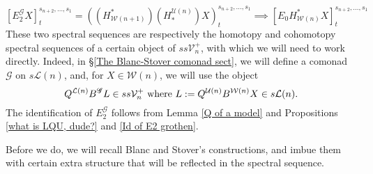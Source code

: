 \documentclass[11pt]{amsart} \renewcommand{\baselinestretch}{1.2}
\theoremstyle{plain}
\numberwithin{equation}{section} %
\theoremstyle{plain}
\numberwithin{equation}{chapter} %
\newcommand{\scrG}{\mathscr{G}}
\newcommand{\calU}{\mathcal{U}}
\newcommand{\calL}{\mathcal{L}}
\newcommand{\calV}{\mathcal{V}}
\newcommand{\calw}{\mathcal{W}}
\newcommand{\vect}[2]{\calV^{#1}_{#2}}
\newcommand{\BSW}{{\scrG}}
\newcommand{\BSWres}{B^\BSW}%
\newcommand{\E}[5]{[E^{#1}_{#2}#3]^{#4}_{#5}}
\newcommand{\Edown}[4]{[E_{#1}#2]^{#3}_{#4}}
\begin{document}
\begin{Comp funct sseqs}
\[\E{\BSW}{2}{X}{s_{n+2},\ldots,s_1}{t}=((H^*_{\calw(n+1)})(H_*^{\calU(n)})X)^{s_{n+2},\ldots,s_1}_t\implies \Edown{0}{H^*_{\calw(n)}X}{s_{n+2},\ldots,s_1}{t}\]
These two spectral sequences are respectively the homotopy and cohomotopy spectral sequences of a certain object of $ss\vect{+}{n}$, with which we will need to work directly. Indeed, in \S\ref{The Blanc-Stover comonad sect}, we will define a comonad $\BSW$ on $s\calL(n)$, and, for  $X\in\calw(n)$,
we will use the object
\[Q^{\calL(n)}\BSWres L\in ss\vect{+}{n}\textup{ where } L:=Q^{\calU(n)}{ B^{\calw(n)}X}\in s\calL(n).\]
The identification of $E_2^\BSW$ follows from Lemma \ref{Q of a model} and Propositions \ref{what is LQU, dude?} and \ref{Id of E2 grothen}.



Before we do, we will recall Blanc and Stover's constructions, and imbue them with certain extra structure that will be reflected in the spectral sequence.


\end{Comp funct sseqs}
\end{document}
